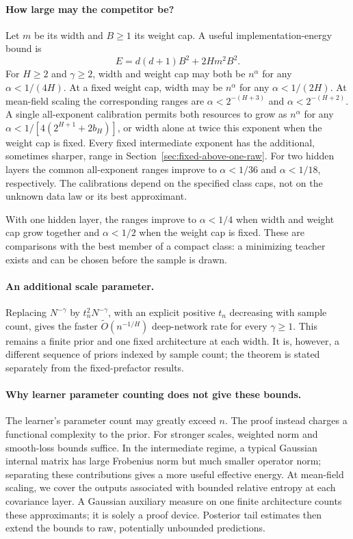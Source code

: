 \documentclass[11pt]{article}
\theoremstyle{remark}\newtheorem{remark}[theorem]{Remark}
\begin{document}
\paragraph{How large may the competitor be?}
Let $m$ be its width and $B\ge1$ its weight cap. A useful implementation-energy bound is
\[
 E=d(d+1)B^2+2Hm^2B^2.
\]
For $H\ge2$ and $\gamma\ge2$, width and weight cap may both be $n^\alpha$ for any $\alpha<1/(4H)$. At a fixed weight cap, width may be $n^\alpha$ for any $\alpha<1/(2H)$. At mean-field scaling the corresponding ranges are $\alpha<2^{-(H+3)}$ and $\alpha<2^{-(H+2)}$. A single all-exponent calibration permits both resources to grow as $n^\alpha$ for any $\alpha<1/[4(2^{H+1}+2b_H)]$, or width alone at twice this exponent when the weight cap is fixed. Every fixed intermediate exponent has the additional, sometimes sharper, range in Section~\ref{sec:fixed-above-one-raw}. For two hidden layers the common all-exponent ranges improve to $\alpha<1/36$ and $\alpha<1/18$, respectively. The calibrations depend on the specified class caps, not on the unknown data law or its best approximant.

With one hidden layer, the ranges improve to $\alpha<1/4$ when width and weight cap grow together and $\alpha<1/2$ when the weight cap is fixed. These are comparisons with the best member of a compact class: a minimizing teacher exists and can be chosen before the sample is drawn.

\paragraph{An additional scale parameter.}
Replacing $N^{-\gamma}$ by $t_n^2N^{-\gamma}$, with an explicit positive $t_n$ decreasing with sample count, gives the faster $\widetilde O(n^{-1/H})$ deep-network rate for every $\gamma\ge1$. This remains a finite prior and one fixed architecture at each width. It is, however, a different sequence of priors indexed by sample count; the theorem is stated separately from the fixed-prefactor results.

\paragraph{Why learner parameter counting does not give these bounds.}
The learner's parameter count may greatly exceed $n$. The proof instead charges a functional complexity to the prior. For stronger scales, weighted norm and smooth-loss bounds suffice. In the intermediate regime, a typical Gaussian internal matrix has large Frobenius norm but much smaller operator norm; separating these contributions gives a more useful effective energy. At mean-field scaling, we cover the outputs associated with bounded relative entropy at each covariance layer. A Gaussian auxiliary measure on one finite architecture counts these approximants; it is solely a proof device. Posterior tail estimates then extend the bounds to raw, potentially unbounded predictions.
\end{document}
